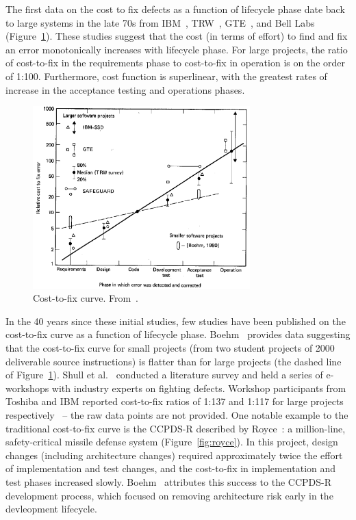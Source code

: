 
The first data on the cost to fix defects as a function of lifecycle phase date back to large systems in the late 70s from IBM~\cite{Fagan76}, TRW~\cite{Boehm76}, GTE~\cite{Daly77}, and Bell Labs~\cite{Stephenson76} (Figure~\ref{fig:cost-to-fix}). These studies suggest that the cost (in terms of effort) to find and fix an error monotonically increases with lifecycle phase. For large projects, the ratio of cost-to-fix in the requirements phase to cost-to-fix in operation is on the order of 1:100. Furthermore, cost function is superlinear, with the greatest rates of increase in the acceptance testing and operations phases.

\begin{figure}[!h]
 \includegraphics[width=3.3in]{boehm_cost-to-fix.png}
 \caption{Cost-to-fix curve. From~\cite{Boehm81}.}\label{fig:cost-to-fix}
 \end{figure}
 
In the 40 years since these initial studies, few studies have been published on the cost-to-fix curve as a function of lifecycle phase. Boehm~\cite{Boehm80} provides data suggesting that the cost-to-fix curve for small projects (from two student projects of 2000 deliverable source instructions) is flatter than for large projects (the dashed line of Figure~\ref{fig:cost-to-fix}). Shull et al.~\cite{Shull02} conducted a literature survey and held a series of e-workshops with industry experts on fighting defects. Workshop participants from Toshiba and IBM reported cost-to-fix ratios of 1:137 and 1:117 for large projects respectively~\cite{Shull02} -- the raw data points are not provided. One notable example to the traditional cost-to-fix curve is the CCPDS-R described by Royce~\cite{Royce98}: a million-line, safety-critical missile defense system (Figure~\ref{fig:royce}). In this project, design changes (including architecture changes) required approximately twice the effort of implementation and test changes, and the cost-to-fix in implementation and test phases increased slowly. Boehm~\cite{Boehm10} attributes this success to the CCPDS-R development process, which focused on removing architecture risk early in the devleopment lifecycle.

